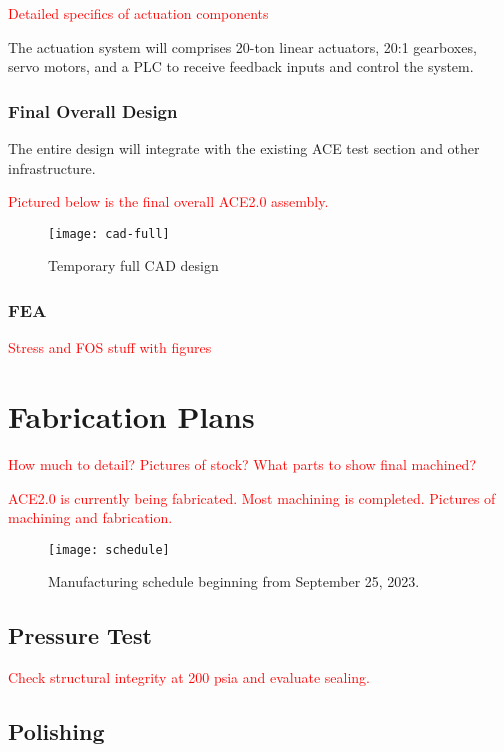 \textcolor{red}{Detailed specifics of actuation components}

The actuation system will comprises 20-ton linear actuators, 20:1 gearboxes, servo motors, and a PLC to receive feedback inputs and control the system.

\subsubsection{Final Overall Design}

The entire design will integrate with the existing ACE test section and other infrastructure.

\textcolor{red}{Pictured below is the final overall ACE2.0 assembly.}

\begin{figure}[ht!]
    \centering
    \texttt{[image: cad-full]}
    \caption{Temporary full CAD design}
    \label{fig:cad-full}
\end{figure}

\subsubsection{FEA}

\textcolor{red}{Stress and FOS stuff with figures}

\section{Fabrication Plans}

\textcolor{red}{How much to detail? Pictures of stock? What parts to show final machined?}

\textcolor{red}{ACE2.0 is currently being fabricated. Most machining is completed. Pictures of machining and fabrication.}

\begin{figure}[ht!]
    \centering
    \texttt{[image: schedule]}
    \caption{Manufacturing schedule beginning from September 25, 2023.}
    \label{fig:schedule}
\end{figure}

\subsection{Pressure Test}

\textcolor{red}{Check structural integrity at 200 psia and evaluate sealing.}

\subsection{Polishing}

